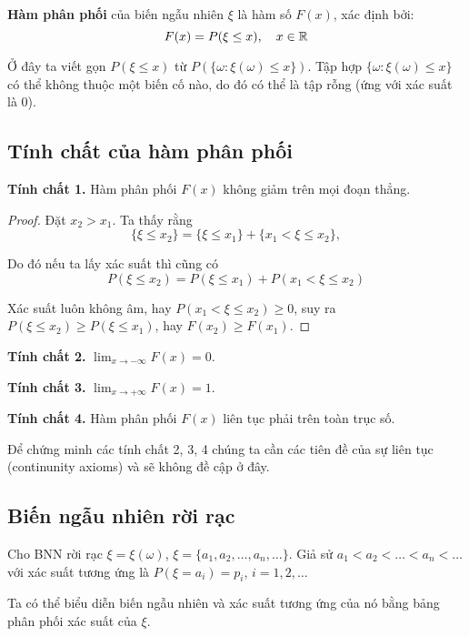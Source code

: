 \begin{definition}
    \textbf{Hàm phân phối} của biến ngẫu nhiên $\xi$ là hàm số $F(x)$, xác định bởi:
    \begin{equation}
        F(x) = P(\xi \leq x), \quad x \in \mathbb{R}
    \end{equation}
\end{definition}

Ở đây ta viết gọn $P(\xi \leq x)$ từ $P(\{ \omega: \xi(\omega) \leq x \})$. Tập hợp $\{ \omega: \xi(\omega) \leq x\}$ có thể không thuộc một biến cố nào, do đó có thể là tập rỗng (ứng với xác suất là 0).

\subsection*{Tính chất của hàm phân phối}

\textbf{Tính chất 1.} Hàm phân phối $F(x)$ không giảm trên mọi đoạn thẳng.

\begin{proof}
    Đặt $x_2 > x_1$. Ta thấy rằng \[\{ \xi \leq x_2 \} = \{ \xi \leq x_1 \} + \{ x_1 < \xi \leq x_2 \},\]
    
    Do đó nếu ta lấy xác suất thì cũng có \[ P(\xi \leq x_2) = P(\xi \leq x_1) + P(x_1 < \xi \leq x_2) \]

    Xác suất luôn không âm, hay $P(x_1 < \xi \leq x_2) \geq 0$, suy ra $P(\xi \leq x_2) \geq P(\xi \leq x_1)$, hay $F(x_2) \geq F(x_1)$.
\end{proof}

\textbf{Tính chất 2.} $\displaystyle{\lim_{x \to -\infty} F(x) = 0}$.

\textbf{Tính chất 3.} $\displaystyle{\lim_{x \to +\infty} F(x) = 1}$.

\textbf{Tính chất 4.} Hàm phân phối $F(x)$ liên tục phải trên toàn trục số.

Để chứng minh các tính chất 2, 3, 4 chúng ta cần các tiên đề của sự liên tục (continunity axioms) và sẽ không đề cập ở đây.

\subsection*{Biến ngẫu nhiên rời rạc}

Cho BNN rời rạc $\xi = \xi(\omega)$, $\xi = \{ a_1, a_2, \ldots, a_n, \ldots \}$. Giả sử $a_1 < a_2 < \ldots < a_n < \ldots$ với xác suất tương ứng là $P(\xi = a_i) = p_i$, $i = 1, 2, \ldots$

Ta có thể biểu diễn biến ngẫu nhiên và xác suất tương ứng của nó bằng bảng phân phối xác suất của $\xi$.

